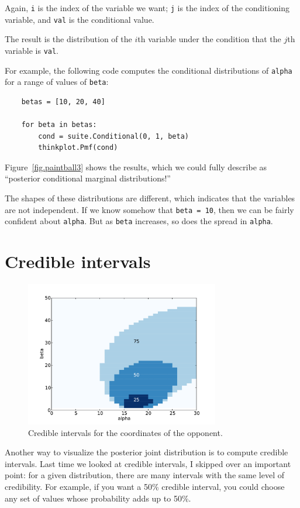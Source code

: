 \documentclass[12pt]{book}
\begin{document}
Again, {\tt i} is the index of the variable we want; {\tt j}
is the index of the conditioning variable, and {\tt val} is the
conditional value.

The result is the distribution of the $i$th variable under the
condition that the $j$th variable is {\tt val}.

For example, the following code computes the conditional distributions
of {\tt alpha} for a range of values of {\tt beta}:

\begin{verbatim}
    betas = [10, 20, 40]

    for beta in betas:
        cond = suite.Conditional(0, 1, beta)
        thinkplot.Pmf(cond)
\end{verbatim}

Figure~\ref{fig.paintball3} shows the results, which we could
fully describe as ``posterior conditional marginal distributions!''

The shapes of these distributions are different, which indicates
that the variables are not independent.  If we know somehow that
{\tt beta = 10}, then we can be fairly confident about {\tt alpha}.
But as {\tt beta} increases, so does the spread in {\tt alpha}.


\section{Credible intervals}

\begin{figure}
\centerline{\includegraphics[height=2.5in]{figs/paintball5.pdf}}
\caption{Credible intervals for the coordinates of the opponent.}
\label{fig.paintball5}
\end{figure}

Another way to visualize the posterior joint distribution is to
compute credible intervals.  Last time we looked at credible intervals,
I skipped over an important point: for a given distribution, there
are many intervals with the same level of credibility.  For example,
if you want a 50\% credible interval, you could choose any set of
values whose probability adds up to 50\%.
\end{document}
